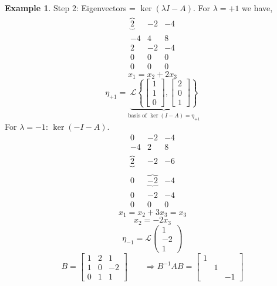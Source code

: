 \documentclass[a4paper,landscape,twocolumn]{article}
\newcommand\set[1]{\left\{#1\right\}}
\newcommand\pivot[1]{\overbrace{\underbrace{#1}_{}}^{}}
\theoremstyle{definition}
\newtheorem{ex}{Example}
\DeclareMathOperator\kernel{ker} %
\begin{document}
\begin{ex}
  Step 2: Eigenvectors = $\kernel(\lambda I - A)$.
  For $\lambda = +1$ we have,
  \[
    \begin{array}{ccc}
      \pivot{2} & -2 & -4 \\
      -4 & 4 & 8 \\
      2 & -2 & -4 \\
    \hline
      0 & 0 & 0 \\
      0 & 0 & 0
    \end{array}
  \] \[
    x_1 = x_2 + 2x_3
  \] \[
    \eta_{+1} = \underbrace{\mathcal L\set{
      \begin{bmatrix} 1 \\ 1 \\ 0 \end{bmatrix},
      \begin{bmatrix} 2 \\ 0 \\ 1 \end{bmatrix}
    }}_{\text{basis of } \kernel(I - A) = \eta_{+1}}
  \]
  For $\lambda = -1$: $\kernel(-I - A)$.
  \[
    \begin{array}{ccc}
      0 & -2 & -4 \\
      -4 & 2 & 8 \\
      \pivot{2} & -2 & -6 \\
    \hline
      0 & \pivot{-2} & -4 \\
      0 & -2 & -4 \\
    \hline
      0 & 0 & 0
    \end{array}
  \]
  \[ x_1 = x_2 + 3x_3 = x_3 \]
  \[ x_2 = -2x_3 \]
  \[ \eta_{-1} = \mathcal L\begin{pmatrix} 1 \\ -2 \\ 1 \end{pmatrix} \]
  \[
    B = \begin{bmatrix}
      1 & 2 & 1 \\
      1 & 0 & -2 \\
      0 & 1 & 1
    \end{bmatrix}
    \qquad \Rightarrow
    B^{-1} A B = \begin{bmatrix}
      1 &   & \\
        & 1 & \\
        &   & -1
    \end{bmatrix}
  \]
\end{ex}
\end{document}
